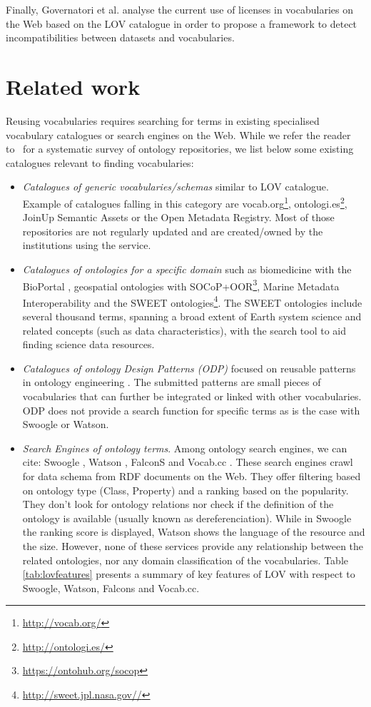 \documentclass{iosart2c}
\begin{document}
Finally, Governatori et al. \cite{governatori2014} analyse the current use of licenses in vocabularies on the Web based on the LOV catalogue in order to propose a framework to detect incompatibilities between datasets and vocabularies.


\section{Related work}
\label{sec:related}
Reusing vocabularies requires searching for terms in existing specialised vocabulary catalogues or search engines on the Web. While we refer the reader to~\cite{AquinJoWS12} for a systematic survey of ontology repositories, we list below some existing catalogues relevant to finding vocabularies:  

\begin{itemize}
 \item \textit{Catalogues of generic vocabularies/schemas} similar to LOV catalogue. Example of catalogues falling in this category are vocab.org\footnote{\url{http://vocab.org/}}, ontologi.es\footnote{\url{http://ontologi.es/}}, JoinUp Semantic Assets or the Open Metadata Registry. Most of those repositories are not regularly updated and are created/owned by the institutions using the service.
 \item \textit{Catalogues of ontologies for a specific domain} such as biomedicine with the BioPortal \cite{bioportal11}, geospatial ontologies with SOCoP+OOR\footnote{\url{https://ontohub.org/socop}}, Marine Metadata Interoperability and the SWEET \cite{sweet05} ontologies\footnote{\url{http://sweet.jpl.nasa.gov//}}. The SWEET ontologies include several thousand terms, spanning a broad extent of Earth system science and related concepts (such as data characteristics), with the search tool to aid finding science data resources. 
 \item \textit{Catalogues of ontology Design Patterns (ODP)} focused on reusable patterns in ontology engineering \cite{presutti08}. The submitted patterns are small pieces of vocabularies that can further be integrated or linked with other vocabularies. ODP does not provide a search function for specific terms as is the case with Swoogle or Watson.
 \item \textit{Search Engines of ontology terms}. Among ontology search engines, we can cite: Swoogle \cite{finin2005swoogle}, Watson \cite{d2007watson,Sabou07}, FalconS \cite{cheng2008falcons} and Vocab.cc \cite{vocabcc2013}. These search engines crawl for data schema from RDF documents on the Web. They offer filtering based on ontology type (Class, Property) and a ranking based on the popularity. They don't look for ontology relations nor check if the definition of the ontology is available (usually known as dereferenciation). While in Swoogle the ranking score is displayed, Watson shows the language of the resource and the size. However, none of these services provide any relationship between the related ontologies, nor any domain classification of the vocabularies. Table \ref{tab:lovfeatures} presents a summary of key features of LOV with respect to Swoogle, Watson, Falcons and Vocab.cc.

\end{itemize}
\end{document}
